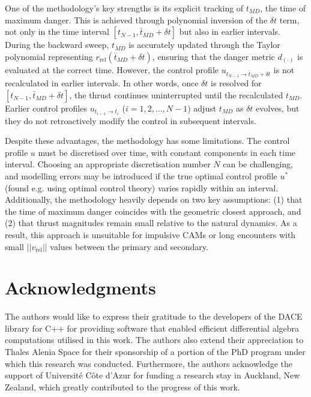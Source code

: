 \documentclass[letterpaper, preprint, paper,11pt]{AAS}	%
\begin{document}

One of the methodology's key strengths is its explicit tracking of \( t_{MD} \), the time of maximum danger. This is achieved through polynomial inversion of the \(\delta t\) term, not only in the time interval \([t_{N-1}, \bar{t}_{MD} + \delta t]\) but also in earlier intervals. During the backward sweep, \( t_{MD} \) is accurately updated through the Taylor polynomial representing $r_{\text{rel}}(\bar{t}_{MD} + \delta t)$, ensuring that the danger metric \(d_{(\cdot)}\) is evaluated at the correct time. However, the control profile \(u_{t_{N-1} \to \bar{t}_{MD} + \delta t}\) is not recalculated in earlier intervals. In other words, once \(\delta t\) is resolved for \([t_{N-1}, \bar{t}_{MD} + \delta t]\), the thrust continues uninterrupted until the recalculated \( t_{MD} \). Earlier control profiles \( u_{t_{i-1} \to t_i} \) (\(i = 1, 2, \dots, N-1\)) adjust \( t_{MD} \) as \(\delta t\) evolves, but they do not retroactively modify the control in subsequent intervals.

Despite these advantages, the methodology has some limitations. The control profile \( u \) must be discretised over time, with constant components in each time interval. Choosing an appropriate discretisation number \( N \) can be challenging, and modelling errors may be introduced if the true optimal control profile \( u^* \) (found e.g. using optimal control theory) varies rapidly within an interval. Additionally, the methodology heavily depends on two key assumptions: (1) that the time of maximum danger coincides with the geometric closest approach, and (2) that thrust magnitudes remain small relative to the natural dynamics. As a result, this approach is unsuitable for impulsive CAMs or long encounters with small \(||v_{\text{rel}}||\) values between the primary and secondary.


\section{Acknowledgments}
The authors would like to express their gratitude to the developers of the DACE library for C++ for providing software that enabled efficient differential algebra computations utilised in this work. The authors also extend their appreciation to Thales Alenia Space for their sponsorship of a portion of the PhD program under which this research was conducted. Furthermore, the authors acknowledge the support of Université Côte d’Azur for funding a research stay in Auckland, New Zealand, which greatly contributed to the progress of this work.
\end{document}
